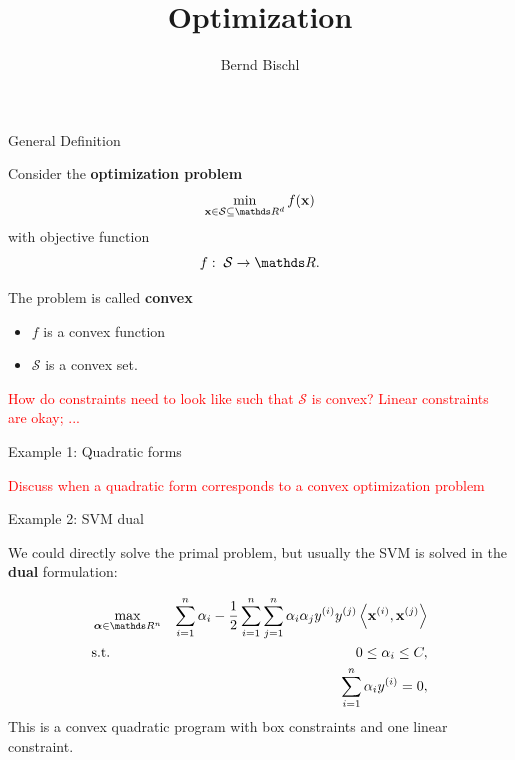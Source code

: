 




\newcommand{\slvec}{\left(\zeta^{(1)}, \zeta^{(n)}\right)} %
\newcommand{\sli}[1][i]{\zeta^{(#1)}} %
\newcommand{\scptxi}{\scp{\thetab}{\xi}} %
\newcommand{\alphav}{\bm{\alpha}} %


\newcommand{\titlefigure}{figure_man/convex-example.png}
\newcommand{\learninggoals}{
\item TODO
\item TODO}



\title{Optimization}
\author{Bernd Bischl}
\date{}



\sloppy


\begin{vbframe}{General Definition}

Consider the \textbf{optimization problem}
$$
\min_{\xv \in \mathcal{S}\subseteq \R^d} \fx
$$
with objective function
$$
f: \; \mathcal{S} \to \R.
$$

The problem is called \textbf{convex}

\begin{itemize}
	\item $f$ is a convex function
	\item $\mathcal{S}$ is a convex set. 
\end{itemize}

\lz 

\textcolor{red}{How do constraints need to look like such that $\mathcal{S}$ is convex? Linear constraints are okay; ...}

\end{vbframe}


\begin{vbframe}{Example 1: Quadratic forms}

\textcolor{red}{Discuss when a quadratic form corresponds to a convex optimization problem}

\end{vbframe}



\begin{frame}{Example 2: SVM dual}
	
We could directly solve the primal problem, but usually the SVM is solved in the \textbf{dual} formulation:  

\begin{eqnarray*}
	& \max\limits_{\alphav \in \R^n} & \sum_{i=1}^n \alpha_i - \frac{1}{2}\sum_{i=1}^n\sum_{j=1}^n\alpha_i\alpha_j\yi y^{(j)} \scp{\xi}{\xv^{(j)}} \\
	& \text{s.t. } & 0 \le \alpha_i \le C, \\
	& \quad & \sum_{i=1}^n \alpha_i \yi = 0,
\end{eqnarray*}
\pause
This is a convex quadratic program with box constraints and one linear constraint.
	
\end{frame}

